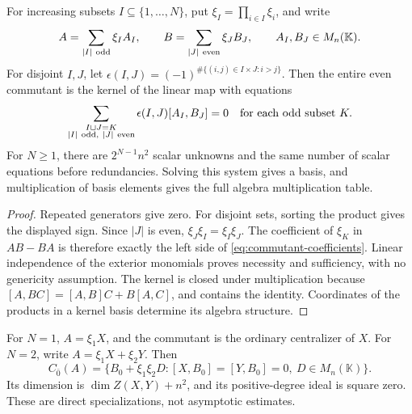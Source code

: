 \begin{proposition}
For increasing subsets \(I\subseteq\{1,\ldots,N\}\), put \(\xi_I=\prod_{i\in I}\xi_i\), and write
\[
 A=\sum_{|I|\ {\rm odd}}\xi_I A_I,\qquad
 B=\sum_{|J|\ {\rm even}}\xi_J B_J,
 \qquad A_I,B_J\in M_n(\mathbb K).
\]
For disjoint \(I,J\), let \(\epsilon(I,J)=(-1)^{\#\{(i,j)\in I\times J:i>j\}}\). Then the entire even commutant is the kernel of the linear map with equations
\begin{equation}
 \sum_{\substack{I\sqcup J=K\\|I|\ {\rm odd},\ |J|\ {\rm even}}}
 \epsilon(I,J)[A_I,B_J]=0
 \quad\text{for each odd subset }K.
 \label{eq:commutant-coefficients}
\end{equation}
For \(N\geq1\), there are \(2^{N-1}n^2\) scalar unknowns and the same number of scalar equations before redundancies. Solving this system gives a basis, and multiplication of basis elements gives the full algebra multiplication table.
\end{proposition}
\begin{proof}
Repeated generators give zero. For disjoint sets, sorting the product gives the displayed sign. Since \(|J|\) is even, \(\xi_J\xi_I=\xi_I\xi_J\). The coefficient of \(\xi_K\) in \(AB-BA\) is therefore exactly the left side of \eqref{eq:commutant-coefficients}. Linear independence of the exterior monomials proves necessity and sufficiency, with no genericity assumption. The kernel is closed under multiplication because \([A,BC]=[A,B]C+B[A,C]\), and contains the identity. Coordinates of the products in a kernel basis determine its algebra structure.
\end{proof}

\begin{remark}
For \(N=1\), \(A=\xi_1X\), and the commutant is the ordinary centralizer of \(X\). For \(N=2\), write \(A=\xi_1X+\xi_2Y\). Then
\[
 C_{\bar0}(A)=\{B_0+\xi_1\xi_2D:[X,B_0]=[Y,B_0]=0,
 \ D\in M_n(\mathbb K)\}.
\]
Its dimension is \(\dim Z(X,Y)+n^2\), and its positive-degree ideal is square zero. These are direct specializations, not asymptotic estimates.
\end{remark}

